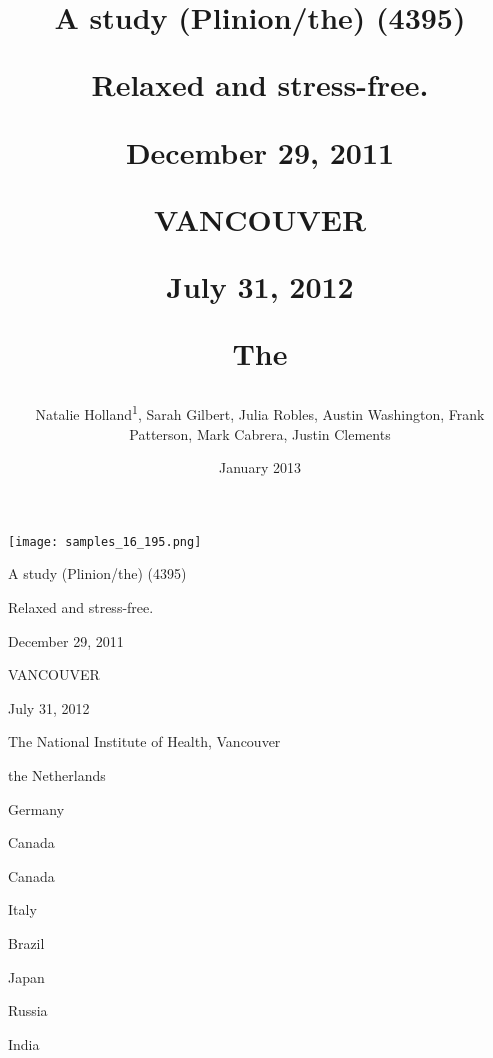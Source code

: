 \documentclass{article}
\title{A study (Plinion/the) (4395)

Relaxed and stress-free.

December 29, 2011

VANCOUVER

July 31, 2012

The}
\author{Natalie Holland\textsuperscript{1},  Sarah Gilbert,  Julia Robles,  Austin Washington,  Frank Patterson,  Mark Cabrera,  Justin Clements}
\affil{\textsuperscript{1}McGill University}
\date{January 2013}
\begin{document}
\maketitle

\begin{center}
\begin{minipage}{0.75\linewidth}
\texttt{[image: samples\_16\_195.png]}
\end{minipage}
\end{center}

A study (Plinion/the) (4395)

Relaxed and stress-free.

December 29, 2011

VANCOUVER

July 31, 2012

The National Institute of Health, Vancouver

the Netherlands

Germany

Canada

Canada

Italy

Brazil

Japan

Russia

India
\end{document}
